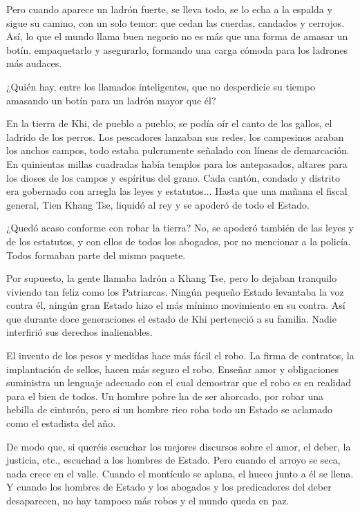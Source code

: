 \documentclass[hidelinks]{memoir}
\begin{document}
	Pero cuando aparece un ladrón fuerte, se lleva todo, se lo echa a la
	espalda y sigue su camino, con un solo temor: que cedan las cuerdas,
	candados y cerrojos. Así, lo que el mundo llama buen negocio no es más
	que una forma de amasar un botín, empaquetarlo y asegurarlo, formando
	una carga cómoda para los ladrones más audaces.
	
	¿Quién hay, entre los llamados inteligentes, que no desperdicie su
	tiempo amasando un botín para un ladrón mayor que él?
	
	En la tierra de Khi, de pueblo a pueblo, se podía oír el canto de los
	gallos, el ladrido de los perros. Los pescadores lanzaban sus redes, los
	campesinos araban los anchos campos, todo estaba pulcramente señalado
	con líneas de demarcación. En quinientas millas cuadradas había templos
	para los antepasados, altares para los dioses de los campos y espíritus
	del grano. Cada cantón, condado y distrito era gobernado con arregla las
	leyes y estatutos... Hasta que una mañana el fiscal general, Tien Khang
	Tse, liquidó al rey y se apoderó de todo el Estado.
	
	¿Quedó acaso conforme con robar la tierra? No, se apoderó también de las
	leyes y de los estatutos, y con ellos de todos los abogados, por no
	mencionar a la policía. Todos formaban parte del mismo paquete.
	
	Por supuesto, la gente llamaba ladrón a Khang Tse, pero lo dejaban
	tranquilo viviendo tan feliz como los Patriarcas. Ningún pequeño Estado
	levantaba la voz contra él, ningún gran Estado hizo el más mínimo
	movimiento en su contra. Así que durante doce generaciones el estado de
	Khi perteneció a su familia. Nadie interfirió sus derechos inalienables.
	
	El invento de los pesos y medidas hace más fácil el robo. La firma de
	contratos, la implantación de sellos, hacen más seguro el robo. Enseñar
	amor y obligaciones suministra un lenguaje adecuado con el cual
	demostrar que el robo es en realidad para el bien de todos. Un hombre
	pobre ha de ser ahorcado, por robar una hebilla de cinturón, pero si un
	hombre rico roba todo un Estado se aclamado como el estadista del año.
	
	De modo que, si queréis escuchar los mejores discursos sobre el amor, el
	deber, la justicia, etc., escuchad a los hombres de Estado. Pero cuando
	el arroyo se seca, nada crece en el valle. Cuando el montículo se
	aplana, el hueco junto a él se llena. Y cuando los hombres de Estado y
	los abogados y los predicadores del deber desaparecen, no hay tampoco
	más robos y el mundo queda en paz.
	
\end{document}
